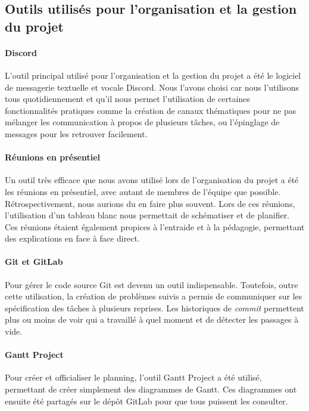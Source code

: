 \subsection{Outils utilisés pour l'organisation et la gestion du projet}

\paragraph{Discord} L'outil principal utilisé pour
l'organisation et la gestion du projet a été le logiciel de
messagerie textuelle et vocale Discord. Nous l'avons choisi
car nous l'utilisons tous quotidiennement et qu'il nous
permet l'utilisation de certaines fonctionnalités pratiques
comme la création de canaux thématiques pour ne pas mélanger
les communication à propos de plusieurs tâches, ou l'épinglage
de messages pour les retrouver facilement.

\paragraph{Réunions en présentiel} Un outil très efficace que
nous avons utilisé lors de l'organisation du projet a été les
réunions en présentiel, avec autant de membres de l'équipe que
possible. Rétrospectivement, nous aurions du en faire plus
souvent. Lors de ces réunions, l'utilisation d'un tableau
blanc nous permettait de schématiser et de planifier. Ces
réunions étaient également propices à l'entraide et à la
pédagogie, permettant des explications en face à face direct.

\paragraph{Git et GitLab} Pour gérer le code source Git est
devenu un outil indispensable. Toutefois, outre cette
utilisation, la création de problèmes suivis a permis
de communiquer sur les spécification des tâches à plusieurs
reprises. Les historiques de \textit{commit} permettent plus
ou moins de voir qui a travaillé à quel moment et de détecter
les passages à vide.

\paragraph{Gantt Project} Pour créer et officialiser le
planning, l'outil Gantt Project a été utilisé, permettant de
créer simplement des diagrammes de Gantt. Ces diagrammes ont ensuite été partagés sur le dépôt GitLab pour que tous puissent les consulter.

